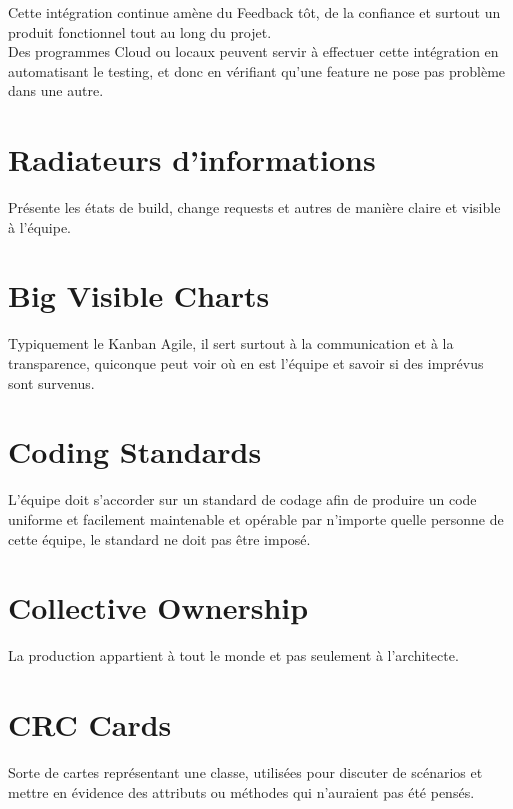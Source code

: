 \documentclass{report}
\begin{document}
		Cette intégration continue amène du Feedback tôt, de la confiance et surtout un produit fonctionnel tout au long du projet.\\

		Des programmes Cloud ou locaux peuvent servir à effectuer cette intégration en automatisant le testing, et donc en vérifiant qu'une feature ne pose pas problème dans une autre.\\

	\section{Radiateurs d'informations}

		Présente les états de build, change requests et autres de manière claire et visible à l'équipe.\\

	\section{Big Visible Charts}

		Typiquement le Kanban Agile, il sert surtout à la communication et à la transparence, quiconque peut voir où en est l'équipe et savoir si des imprévus sont survenus.\\

	\section{Coding Standards}

		L'équipe doit s'accorder sur un standard de codage afin de produire un code uniforme et facilement maintenable et opérable par n'importe quelle personne de cette équipe, le standard ne doit pas être imposé.\\

	\section{Collective Ownership}

		La production appartient à tout le monde et pas seulement à l'architecte.\\

	\section{CRC Cards}

		Sorte de cartes représentant une classe, utilisées pour discuter de scénarios et mettre en évidence des attributs ou méthodes qui n'auraient pas été pensés.\\
\end{document}
